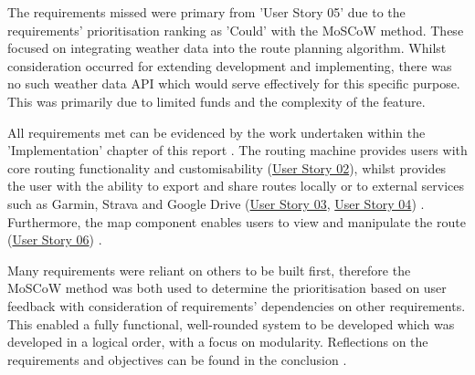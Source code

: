 The requirements missed were primary from 'User Story 05'  due to the requirements' prioritisation ranking as 'Could' with the MoSCoW method. These focused on integrating weather data into the route planning algorithm. Whilst consideration occurred for extending development and implementing, there was no such weather data API which would serve effectively for this specific purpose. This was primarily due to limited funds and the complexity of the feature.

All requirements met can be evidenced by the work undertaken within the 'Implementation' chapter of this report . The routing machine provides users with core routing functionality and customisability (\hyperref[tab:user-story-02]{User Story 02}), whilst provides the user with the ability to export and share routes locally or to external services such as Garmin, Strava and Google Drive (\hyperref[tab:user-story-03]{User Story 03}, \hyperref[tab:user-story-04]{User Story 04}) . Furthermore, the map component enables users to view and manipulate the route (\hyperref[tab:user-story-06]{User Story 06}) .

Many requirements were reliant on others to be built first, therefore the MoSCoW method was both used to determine the prioritisation based on user feedback with consideration of requirements' dependencies on other requirements. This enabled a fully functional, well-rounded system to be developed which was developed in a logical order, with a focus on modularity. Reflections on the requirements and objectives can be found in the conclusion .

